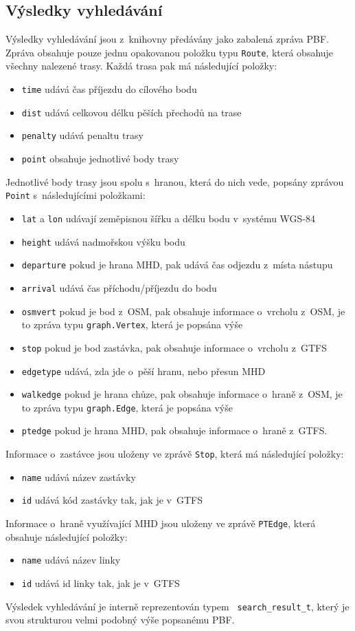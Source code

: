 \subsection{Výsledky vyhledávání}
\label{ch:formaty-dat:vysledky}
Výsledky vyhledávání jsou z~knihovny předávány jako zabalená zpráva PBF. Zpráva
obsahuje pouze jednu opakovanou položku typu {\tt Route}, která obsahuje všechny
nalezené trasy. Každá trasa pak má následující položky: 
\begin{itemize}
	\item {\tt time} udává čas příjezdu do cílového bodu
	\item {\tt dist} udává celkovou délku pěších přechodů na trase
	\item {\tt penalty} udává penaltu trasy
	\item {\tt point} obsahuje jednotlivé body trasy
\end{itemize}
Jednotlivé body trasy jsou spolu s~hranou, která do nich vede, popsány zprávou
{\tt Point} s~následujícími položkami: 
\begin{itemize}
	\item {\tt lat} a {\tt lon} udávají zeměpisnou šířku a délku bodu
v~systému WGS-84
	\item {\tt height} udává nadmořskou výšku bodu
	\item {\tt departure} pokud je hrana MHD, pak udává čas odjezdu z~místa
	nástupu
	\item {\tt arrival} udává čas příchodu/příjezdu do bodu 
	\item {\tt osmvert} pokud je bod z~OSM, pak obsahuje informace o~vrcholu
	z~OSM, je to zpráva typu {\tt graph.Vertex}, která je popsána výše
	\item {\tt stop} pokud je bod zastávka, pak obsahuje informace o~vrcholu z~GTFS
	\item {\tt edgetype} udává, zda jde o~pěší hranu, nebo přesun MHD
	\item {\tt walkedge} pokud je hrana chůze, pak obsahuje informace
o~hraně z~OSM, je to zpráva typu {\tt graph.Edge}, která je popsána výše
	\item {\tt ptedge} pokud je hrana MHD, pak obsahuje informace o~hraně
z~GTFS.
\end{itemize}
Informace o~zastávce jsou uloženy ve zprávě {\tt Stop}, která má následující
položky:
\begin{itemize}
	\item {\tt name} udává název zastávky
	\item {\tt id} udává kód zastávky tak, jak je v~GTFS
\end{itemize}
Informace o~hraně využívající MHD jsou uloženy ve zprávě {\tt PTEdge}, která
obsahuje následující položky:
\begin{itemize}
	\item {\tt name} udává název linky
	\item {\tt id} udává id linky tak, jak je v~GTFS
\end{itemize}
Výsledek vyhledávání je interně reprezentován typem {\tt
search\_result\_t}, který je svou strukturou velmi podobný výše popsanému PBF.

